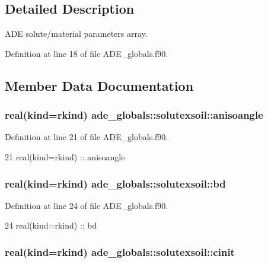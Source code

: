 \subsection{Detailed Description}
A\+DE solute/material parameters array. 

Definition at line 18 of file A\+D\+E\+\_\+globals.\+f90.



\subsection{Member Data Documentation}
\subsubsection[{anisoangle}]{\setlength{\rightskip}{0pt plus 5cm}real(kind=rkind) ade\+\_\+globals\+::solutexsoil\+::anisoangle}\label{structade__globals_1_1solutexsoil_ae7ac6986f0e5d809f74bf064a78aa17c}


Definition at line 21 of file A\+D\+E\+\_\+globals.\+f90.


\begin{DoxyCode}
21     \textcolor{keywordtype}{real(kind=rkind)} :: anisoangle
\end{DoxyCode}
\subsubsection[{bd}]{\setlength{\rightskip}{0pt plus 5cm}real(kind=rkind) ade\+\_\+globals\+::solutexsoil\+::bd}\label{structade__globals_1_1solutexsoil_af5fa36b066b42b99a47ee505de69c01a}


Definition at line 24 of file A\+D\+E\+\_\+globals.\+f90.


\begin{DoxyCode}
24     \textcolor{keywordtype}{real(kind=rkind)} :: bd
\end{DoxyCode}
\subsubsection[{cinit}]{\setlength{\rightskip}{0pt plus 5cm}real(kind=rkind) ade\+\_\+globals\+::solutexsoil\+::cinit}\label{structade__globals_1_1solutexsoil_a669669d8584eb397341b16e158ff5ddb}


